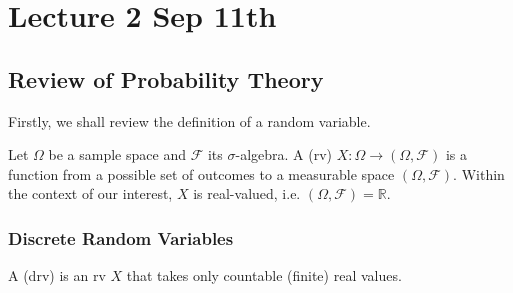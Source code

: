 \documentclass[notoc,notitlepage]{tufte-book}
\begin{document}


\chapter{Lecture 2 Sep 11th}%
\label{chp:lecture_2_sep_11th}

\section{Review of Probability Theory}%
\label{sec:review_of_probability_theory}

Firstly, we shall review the definition of a random variable.

\begin{defn}\label{defn:random_variable}
  Let $\Omega$ be a sample space and $\mathcal{F}$ its $\sigma$-algebra. A  (rv) $X : \Omega \to (\Omega, \mathcal{F})$ is a function from a possible set of outcomes to a measurable space $(\Omega, \mathcal{F})$. Within the context of our interest, $X$ is real-valued, i.e. $(\Omega, \mathcal{F}) = \mathbb{R}$.
\end{defn}

\subsection{Discrete Random Variables}%
\label{sub:discrete_random_variables}

\begin{defn}\label{defn:discrete_random_variable}
  A  (drv) is an rv $X$ that takes only countable (finite) real values.
\end{defn}
\end{document}
